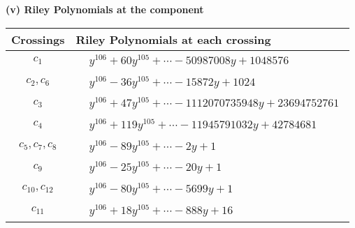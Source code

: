 \documentclass[1p]{elsarticle_modified}
\theoremstyle{definition}
\begin{document}
\newpage\renewcommand{\arraystretch}{1}
\flushleft \textbf{(v) Riley Polynomials at the component}\newline \\
\begin{tabular}{m{50pt}|m{274pt}}
Crossings & \hspace{64pt}Riley Polynomials at each crossing \\
\hline $$\begin{aligned}c_{1}\end{aligned}$$&$\begin{aligned}
&y^{106}+60 y^{105}+\cdots-50987008 y+1048576
\end{aligned}$\\
\hline $$\begin{aligned}c_{2},c_{6}\end{aligned}$$&$\begin{aligned}
&y^{106}-36 y^{105}+\cdots-15872 y+1024
\end{aligned}$\\
\hline $$\begin{aligned}c_{3}\end{aligned}$$&$\begin{aligned}
&y^{106}+47 y^{105}+\cdots-1112070735948 y+23694752761
\end{aligned}$\\
\hline $$\begin{aligned}c_{4}\end{aligned}$$&$\begin{aligned}
&y^{106}+119 y^{105}+\cdots-11945791032 y+42784681
\end{aligned}$\\
\hline $$\begin{aligned}c_{5},c_{7},c_{8}\end{aligned}$$&$\begin{aligned}
&y^{106}-89 y^{105}+\cdots-2 y+1
\end{aligned}$\\
\hline $$\begin{aligned}c_{9}\end{aligned}$$&$\begin{aligned}
&y^{106}-25 y^{105}+\cdots-20 y+1
\end{aligned}$\\
\hline $$\begin{aligned}c_{10},c_{12}\end{aligned}$$&$\begin{aligned}
&y^{106}-80 y^{105}+\cdots-5699 y+1
\end{aligned}$\\
\hline $$\begin{aligned}c_{11}\end{aligned}$$&$\begin{aligned}
&y^{106}+18 y^{105}+\cdots-888 y+16
\end{aligned}$\\
\hline
\end{tabular}\\~\\
\end{document}
